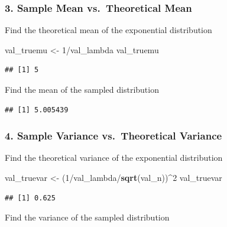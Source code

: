 \documentclass[]{article}
\newenvironment{Shaded}{\begin{snugshade}}{\end{snugshade}}
\newcommand{\KeywordTok}[1]{\textcolor[rgb]{0.13,0.29,0.53}{\textbf{{#1}}}}
\newcommand{\DecValTok}[1]{\textcolor[rgb]{0.00,0.00,0.81}{{#1}}}
\newcommand{\StringTok}[1]{\textcolor[rgb]{0.31,0.60,0.02}{{#1}}}
\newcommand{\NormalTok}[1]{{#1}}
\begin{document}
\subsubsection{3. Sample Mean vs.~Theoretical
Mean}\label{sample-mean-vs.theoretical-mean}

Find the theoretical mean of the exponential distribution

\begin{Shaded}
\begin{Highlighting}[]
\NormalTok{val_truemu <-}\StringTok{ }\DecValTok{1}\NormalTok{/val_lambda}
\NormalTok{val_truemu}
\end{Highlighting}
\end{Shaded}

\begin{verbatim}
## [1] 5
\end{verbatim}

Find the mean of the sampled distribution

\begin{Shaded}
\end{Shaded}

\begin{verbatim}
## [1] 5.005439
\end{verbatim}

\subsubsection{4. Sample Variance vs.~Theoretical
Variance}\label{sample-variance-vs.theoretical-variance}

Find the theoretical variance of the exponential distribution

\begin{Shaded}
\begin{Highlighting}[]
\NormalTok{val_truevar <-}\StringTok{ }\NormalTok{(}\DecValTok{1}\NormalTok{/val_lambda/}\KeywordTok{sqrt}\NormalTok{(val_n))^}\DecValTok{2}
\NormalTok{val_truevar}
\end{Highlighting}
\end{Shaded}

\begin{verbatim}
## [1] 0.625
\end{verbatim}

Find the variance of the sampled distribution
\end{document}
